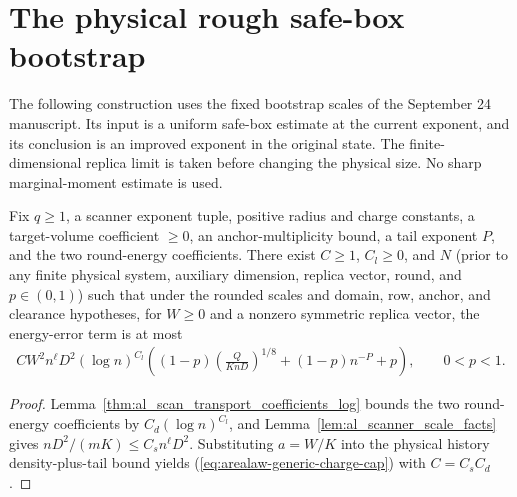 \section{The physical rough safe-box bootstrap}
\label{sec:arealaw-physical-box-bootstrap}

The following construction uses the fixed bootstrap scales of the
September 24 manuscript.  Its input is a uniform safe-box estimate at the
current exponent, and its conclusion is an improved exponent in the
original state.  The finite-dimensional replica limit is taken before
changing the physical size.  No sharp marginal-moment estimate is used.

\begin{lemma}
    \label{thm:arealaw-generic-charge-energy}
    \leanok
    Fix $q\geq1$, a scanner exponent tuple, positive radius and charge constants,
    a target-volume coefficient $\ge0$, an anchor-multiplicity bound, a tail exponent $P$,
    and the two round-energy coefficients. There exist $C\geq1$, $C_l\geq0$, and $N$
    (prior to any finite physical system, auxiliary dimension, replica vector, round, and $p\in(0,1)$)
    such that under the rounded scales and domain, row, anchor, and clearance hypotheses,
    for $W\geq0$ and a nonzero symmetric replica vector, the energy-error term is at most
    \begin{align}
        C W^2 n^\ell D^2(\log n)^{C_l}
        \left((1-p)\left(\frac{Q}{KnD}\right)^{1/8}
        +(1-p)n^{-P}+p\right),
        \qquad 0<p<1.
        \label{eq:arealaw-generic-charge-cap}
    \end{align}
\end{lemma}
\begin{proof}
    \leanok
    Lemma~\ref{thm:al_scan_transport_coefficients_log} bounds the two round-energy coefficients by
    $C_d(\log n)^{C_l}$, and Lemma~\ref{lem:al_scanner_scale_facts} gives $nD^2/(mK)\leq C_s n^\ell D^2$.
    Substituting $a=W/K$ into the physical history density-plus-tail bound yields
    (\ref{eq:arealaw-generic-charge-cap}) with $C=C_sC_d$.
\end{proof}


